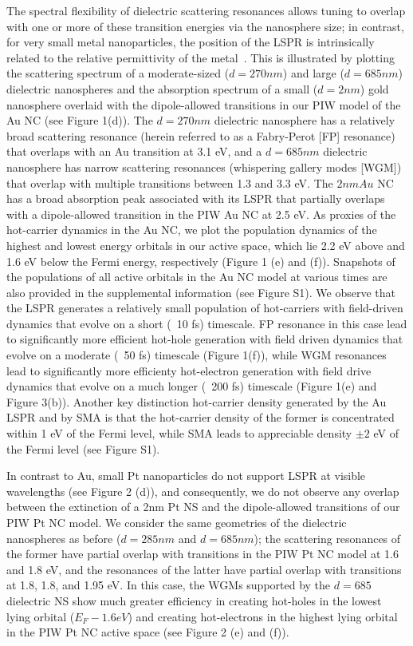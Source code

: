 \documentclass[journal=jpclcd,manuscript=letter]{achemso}
\begin{document}
The spectral flexibility of dielectric scattering
resonances allows tuning to overlap with one or more of these transition energies via the nanosphere size; in contrast, for very small 
metal nanoparticles, the position of the LSPR is intrinsically related to the relative permittivity of the metal~\cite{Bohren}.  This is
illustrated by plotting the scattering spectrum of a moderate-sized ($d=270nm$) and large ($d=685nm$) dielectric nanospheres and the 
absorption spectrum of a small ($d=2nm$) gold nanosphere overlaid with the dipole-allowed
transitions in our PIW model of the Au NC (see Figure 1(d)). The $d=270nm$ dielectric nanosphere has a relatively broad scattering resonance 
(herein referred to as a Fabry-Perot [FP] resonance) that overlaps 
with an Au transition at 3.1 eV, and
a $d=685nm$ dielectric nanosphere has narrow scattering resonances (whispering gallery modes [WGM]) 
that overlap with multiple transitions between 1.3 and 3.3 eV.  The $2nm Au$ NC has a broad absorption peak associated with its LSPR that partially
overlaps with a dipole-allowed transition in the PIW Au NC at 2.5 eV. 
As proxies of the hot-carrier dynamics in the Au NC, we plot the population dynamics of the highest and lowest energy orbitals in our active space, which lie
2.2 eV above and 1.6 eV below the Fermi energy, respectively (Figure 1 (e) and (f)).  Snapshots of the populations of all active
orbitals in the Au NC model at various times are also provided in the supplemental information (see Figure S1).  
We observe that the LSPR generates a relatively small
population of hot-carriers with field-driven dynamics that evolve on a short (~10 fs) timescale.  FP resonance in this
case lead to significantly more efficient hot-hole generation with field driven dynamics that evolve on a moderate (~50 fs) timescale (Figure 1(f)), while
WGM resonances lead to significantly more efficienty hot-electron generation with field drive dynamics that evolve on a much longer (~200 fs) timescale
(Figure 1(e) and Figure 3(b)).  Another key distinction hot-carrier density generated by the Au LSPR and by SMA is that the hot-carrier density
of the former is concentrated within 1 eV of the Fermi level, while SMA leads to appreciable density $\pm 2$ eV of the Fermi level (see Figure S1).

In contrast to Au, small Pt nanoparticles do not support LSPR at visible wavelengths (see Figure 2 (d)), and consequently, we do not
observe any overlap between the extinction of a 2nm Pt NS and the dipole-allowed transitions of our PIW Pt NC model.  We consider
the same geometries of the dielectric nanospheres as before ($d=285nm$ and $d=685 nm$); the scattering resonances of the former have partial overlap with transitions in the PIW Pt NC model at 1.6 and 1.8 eV, and the resonances of the latter have partial 
overlap with transitions at 1.8, 1.8, and 1.95 eV.  In this case, the WGMs supported by the $d=685$ dielectric NS show much greater efficiency in 
creating hot-holes in the lowest lying orbital ($E_F - 1.6 eV$) and creating hot-electrons in the highest lying orbital in the PIW Pt NC active 
space (see Figure 2 (e) and (f)).
\end{document}
